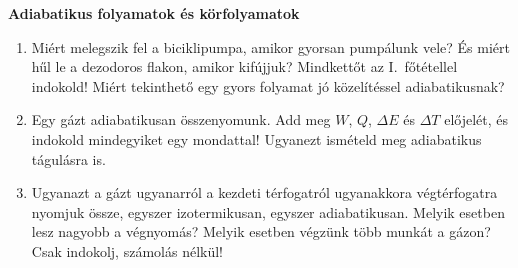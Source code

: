 \documentclass[12pt]{article}
\begin{document}
\begin{center}\vspace*{-0.4cm}
  {\Large\bfseries Adiabatikus folyamatok és körfolyamatok}\\[5pt]
\end{center}
\vspace{-8pt}

\begin{enumerate}
\item Miért melegszik fel a biciklipumpa, amikor gyorsan pumpálunk vele? És miért
  hűl le a dezodoros flakon, amikor kifújjuk? Mindkettőt az I.~főtétellel indokold!
  Miért tekinthető egy gyors folyamat jó közelítéssel adiabatikusnak?

\item Egy gázt adiabatikusan összenyomunk. Add meg $W$, $Q$, $\Delta E$ és $\Delta T$
  előjelét, és indokold mindegyiket egy mondattal! Ugyanezt ismételd meg adiabatikus
  tágulásra is.

\item \begin{minipage}[t]{0.68\linewidth}
  Ugyanazt a gázt ugyanarról a kezdeti térfogatról ugyanakkora végtérfogatra nyomjuk
  össze, egyszer izotermikusan, egyszer adiabatikusan. Melyik esetben lesz nagyobb a
  végnyomás? Melyik esetben végzünk több munkát a gázon? Csak indokolj, számolás nélkül!
  \end{minipage}\hfill
  \begin{minipage}[t]{0.28\linewidth}\vspace{-0.7cm}\centering
  \end{minipage}


\end{enumerate}
\end{document}
